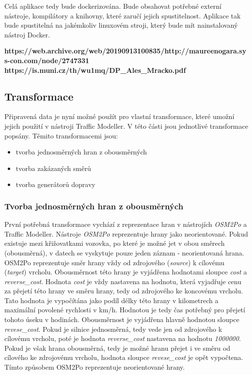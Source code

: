 Celá aplikace tedy bude dockerizována. Bude obsahovat potřebné externí nástroje, kompilátory a knihovny, které zaručí jejich spustitelnost. Aplikace tak bude spustitelná na jakémkoliv linuxovém stroji, který bude mít nainstalovaný nástroj Docker. 

\textbf{https://web.archive.org/web/20190913100835/http://maureenogara.sys-con.com/node/2747331}
\textbf{https://is.muni.cz/th/wu1mq/DP\_Ales\_Mracko.pdf}


\subsection{Transformace}
\label{subsection:transformace}

Připravená data je nyní možné použít pro vlastní transformace, které umožní jejich použití v nástroji Traffic Modeller. V této části jsou jednotlivé transformace popsány. Těmito transformacemi jsou:

\begin{itemize}
  \item tvorba jednosměrných hran z obousměrných
  \item tvorba zakázaných směrů
  \item tvorba generátorů dopravy
\end{itemize}

\subsubsection{Tvorba jednosměrných hran z obousměrných}
\label{jednosmerne_obousmerne}

První potřebná transformace vychází z reprezentace hran v nástrojích \textit{OSM2Po} a Traffic Modeller. Nástroje \textit{OSM2Po} reprezentuje hrany jako neorientované. Pokud existuje mezi křižovatkami vozovka, po které je možné jet v obou směrech (obousměrná), v datech se vyskytuje pouze jeden záznam - neorientovaná hrana. OSM2Po reprezentuje směr hrany vždy od zdrojového (\textit{source}) k cílovému (\textit{target}) vrcholu. Obousměrnost této hrany je vyjádřena hodnotami sloupce \textit{cost} a \textit{reverse\_cost}. Hodnota \textit{cost} je vždy nastavena na hodnotu, která vyjadřuje cenu za přejetí této hrany ve směru hrany, tedy od zdrojového ke koncovému vrcholu. Tato hodnota je vypočítána jako podíl délky této hrany v kilometrech a maximální povolené rychlosti v km/h. Hodnotou je tedy čas potřebný pro přejetí tohoto úseku v hodinách. Obousměrnost je vyjádřena hlavně hodnotou sloupce \textit{revese\_cost}. Pokud je silnice jednosměrná, tedy vede jen od zdrojového k cílovému vrcholu, poté je hodnota \textit{reverse\_cost} nastavena na hodnotu \textit{1000000}. Pokud je však hrana obousměrná, tedy je možné hranu přejet i ve směru od cílového ke zdrojovému vrcholu, hodnota sloupce \textit{revese\_cost} je opět vypočtena. Tímto způsobem OSM2Po reprezentuje neorientované hrany.

